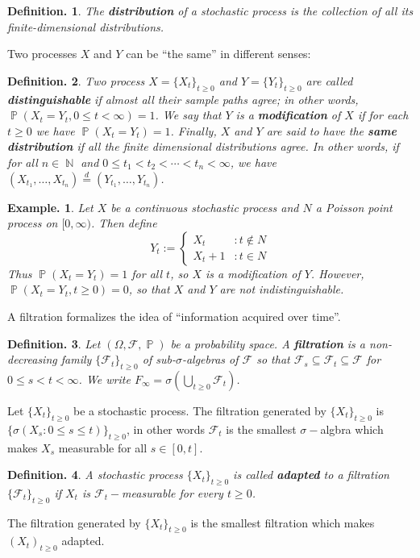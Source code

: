 \documentclass[11pt, a4paper]{memoir}
\DeclareMathOperator{\N}{{\mathbb{N}}}
\theoremstyle{change}
\theoremstyle{plain}
\theoremstyle{nonumberplain}
\newtheorem{definition}{Definition.}
\newtheorem{example}{Example.}
\DeclareMathOperator{\pr}{{\mathbb{P}}}
\newcommand{\defn}[1]{{\boldmath\bfseries #1}}
\numberwithin{equation}{section}
\begin{document}
\begin{definition}
    The \defn{distribution} of a stochastic process is the collection of all its finite-dimensional distributions.
\end{definition}
Two processes $X$ and $Y$ can be ``the same'' in different senses:
\begin{definition}
    Two process $X=\{X_t\}_{t\geq 0}$ and $Y=\{Y_t\}_{t\geq 0}$ are called \defn{distinguishable} if almost all their sample paths agree; in other words, $\pr(X_t=Y_t,0\leq t<\infty)=1$.
    We say that $Y$ is a \defn{modification} of $X$ if for each $t\geq 0$ we have $\pr(X_t=Y_t)=1$.
    Finally, $X$ and $Y$ are said to have the \defn{same distribution} if all the finite dimensional distributions agree.
    In other words, if for all $n\in\N$ and $0\leq t_1<t_2<\cdots<t_n<\infty$, we have $(X_{t_1},\ldots,X_{t_n})\overset{d}{=}(Y_{t_1},\ldots,Y_{t_n})$.
\end{definition}
\begin{example}
    Let $X$ be a continuous stochastic process and $N$ a Poisson point process on $[0,\infty)$.
    Then define
    \begin{equation*}
        Y_t :=
        \begin{cases}
            X_t &: t\notin N\\
            X_t+1 &:t\in N
        \end{cases}
    \end{equation*}
    Thus $\pr(X_t=Y_t)=1$ for all $t$, so $X$ is a modification of $Y$.
    However, $\pr(X_t=Y_t,t\geq 0)=0$, so that $X$ and $Y$ are not indistinguishable.
\end{example}
A filtration formalizes the idea of ``information acquired over time''.
\begin{definition}
    Let $(\Omega,\mathcal{F},\pr)$ be a probability space.
    A \defn{filtration} is a non-decreasing family $\{\mathcal{F}_t\}_{t\geq 0}$ of sub-$\sigma$-algebras of $\mathcal{F}$ so that $\mathcal{F}_s\subseteq\mathcal{F}_t\subseteq\mathcal{F}$ for $0\leq s<t<\infty$.
    We write $F_\infty=\sigma(\bigcup_{t\geq 0}\mathcal{F}_t)$.
\end{definition}
Let $\{X_t\}_{t\geq 0}$ be a stochastic process.
The filtration generated by $\{X_t\}_{t\geq 0}$ is $\{\sigma(X_s:0\leq s\leq t)\}_{t\geq 0}$, in other words $\mathcal{F}_t$ is the smallest $\sigma-$algbra which makes $X_s$ measurable for all $s\in[0,t]$.
\begin{definition}
    A stochastic process $\{X_t\}_{t\geq 0}$ is called \defn{adapted} to a filtration $\{\mathcal{F}_t\}_{t\geq 0}$ if $X_t$ is $\mathcal{F}_t-$measurable for every $t\geq 0$.
\end{definition}
The filtration generated by $\{X_t\}_{t\geq 0}$ is the smallest filtration which makes $(X_t)_{t\geq 0}$ adapted.
\end{document}
